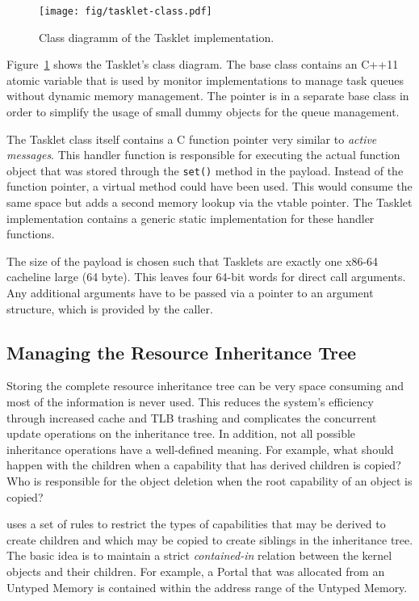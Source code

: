 \begin{figure}
  \centering
  \texttt{[image: fig/tasklet-class.pdf]}
  \caption{Class diagramm of the Tasklet implementation.}
  \label{fig:tasklet-class}
\end{figure}

Figure~\ref{fig:tasklet-class} shows the Tasklet's class diagram. The base class contains an C++11 atomic variable that is used by monitor implementations to manage task queues without dynamic memory management. The pointer is in a separate base class in order to simplify the usage of small dummy objects for the queue management. 

The Tasklet class itself contains a C function pointer very similar to \emph{active messages}. This handler function is responsible for executing the actual function object that was stored through the \lstinline|set()| method in the payload. Instead of the function pointer, a virtual method could have been used. This would consume the same space but adds a second memory lookup via the vtable pointer. The Tasklet implementation contains a generic static implementation for these handler functions.

The size of the payload is chosen such that Tasklets are exactly one x86-64 cacheline large (64 byte). This leaves four 64-bit words for direct call arguments. Any additional arguments have to be passed via a pointer to an argument structure, which is provided by the caller.

\subsection{Managing the Resource Inheritance Tree}
\label{sec:capability-impl}

Storing the complete resource inheritance tree can be very space consuming and most of the information is never used. This reduces the system's efficiency through increased cache and TLB trashing and complicates the concurrent update operations on the inheritance tree. In addition, not all possible inheritance operations have a well-defined meaning. For example, what should happen with the children when a capability that has derived children is copied? Who is responsible for the object deletion when the root capability of an object is copied?

\mythos uses a set of rules to restrict the types of capabilities that may be derived to create children and which may be copied to create siblings in the inheritance tree. The basic idea is to maintain a strict \emph{contained-in} relation between the kernel objects and their children. For example, a Portal that was allocated from an Untyped Memory is contained within the address range of the Untyped Memory.

